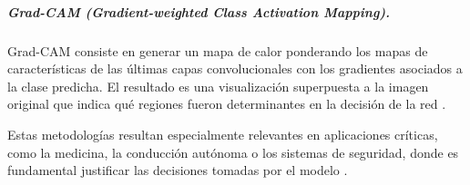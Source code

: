 \subparagraph{Grad-CAM (Gradient-weighted Class Activation Mapping).}

Grad-CAM consiste en generar un mapa de calor ponderando los mapas de características de las
últimas capas convolucionales con los gradientes asociados a la clase predicha. El resultado
es una visualización superpuesta a la imagen original que indica qué regiones fueron
determinantes en la decisión de la red \cite{Selvaraju17-gradcam}.

Estas metodologías resultan especialmente relevantes en aplicaciones críticas, como la
medicina, la conducción autónoma o los sistemas de seguridad, donde es fundamental justificar
las decisiones tomadas por el modelo
\cite{examples_nn__kulik_2009, conv_nn_face_recog__chowanda_2019, slam_vehicles__saleem_2023}.
